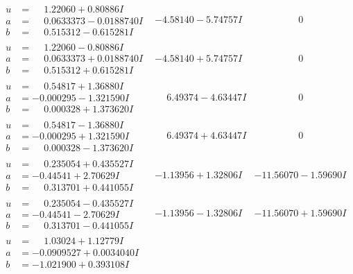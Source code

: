 \documentclass[1p]{elsarticle_modified}
\theoremstyle{definition}
\begin{document}
$$\begin{array}{c|c|c}
\begin{aligned}
u &= \phantom{-}1.22060 + 0.80886 I \\
a &= \phantom{-}0.0633373 - 0.0188740 I \\
b &= \phantom{-}0.515312 - 0.615281 I\end{aligned}
 & -4.58140 - 5.74757 I & \phantom{-0.000000 } 0 \\ \hline\begin{aligned}
u &= \phantom{-}1.22060 - 0.80886 I \\
a &= \phantom{-}0.0633373 + 0.0188740 I \\
b &= \phantom{-}0.515312 + 0.615281 I\end{aligned}
 & -4.58140 + 5.74757 I & \phantom{-0.000000 } 0 \\ \hline\begin{aligned}
u &= \phantom{-}0.54817 + 1.36880 I \\
a &= -0.000295 - 1.321590 I \\
b &= \phantom{-}0.000328 + 1.373620 I\end{aligned}
 & \phantom{-}6.49374 - 4.63447 I & \phantom{-0.000000 } 0 \\ \hline\begin{aligned}
u &= \phantom{-}0.54817 - 1.36880 I \\
a &= -0.000295 + 1.321590 I \\
b &= \phantom{-}0.000328 - 1.373620 I\end{aligned}
 & \phantom{-}6.49374 + 4.63447 I & \phantom{-0.000000 } 0 \\ \hline\begin{aligned}
u &= \phantom{-}0.235054 + 0.435527 I \\
a &= -0.44541 + 2.70629 I \\
b &= \phantom{-}0.313701 + 0.441055 I\end{aligned}
 & -1.13956 + 1.32806 I & -11.56070 - 1.59690 I \\ \hline\begin{aligned}
u &= \phantom{-}0.235054 - 0.435527 I \\
a &= -0.44541 - 2.70629 I \\
b &= \phantom{-}0.313701 - 0.441055 I\end{aligned}
 & -1.13956 - 1.32806 I & -11.56070 + 1.59690 I \\ \hline\begin{aligned}
u &= \phantom{-}1.03024 + 1.12779 I \\
a &= -0.0909527 + 0.0034040 I \\
b &= -1.021900 + 0.393108 I\end{aligned}

\end{array}$$
\end{document}
